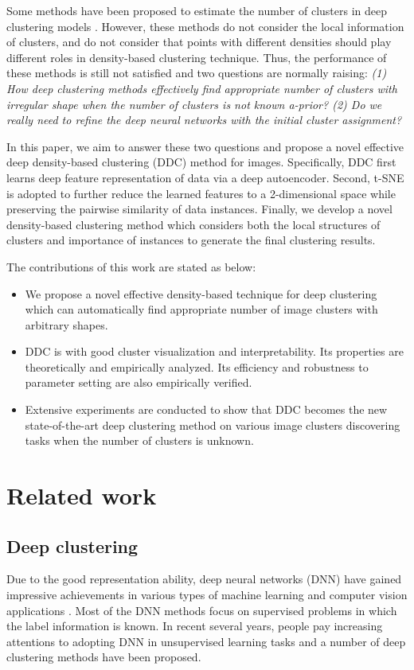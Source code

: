\documentclass[10pt,twocolumn,letterpaper]{article}
\begin{document}
Some methods have been proposed to estimate the number of clusters in deep clustering models \cite{lin2018deep,Shah2018DCC,Wang2018DED}. However, these methods  do not consider the local information of clusters, and do not consider that points with different densities should play different roles in density-based clustering technique.  Thus, the performance of these methods is still not satisfied and two questions are normally raising: \textit{(1) How deep clustering methods effectively find appropriate number of clusters with irregular shape when the number of clusters is not known a-prior? (2) Do we really need to refine the deep neural networks  with the initial cluster assignment?}


In this paper, we aim to answer these two questions and propose a novel effective deep density-based clustering (DDC) method for images. Specifically, DDC first learns deep feature representation of data via a deep autoencoder. Second, t-SNE \cite{maaten2008tSNE} is adopted to further reduce the learned features to a 2-dimensional space while preserving the pairwise similarity of data instances. Finally, we develop a novel density-based clustering method which considers both the local structures of clusters and importance of instances to generate the final clustering results. 

The contributions of this work are stated as below:
\begin{itemize}
    \item We propose a novel effective density-based technique for deep clustering which can automatically find appropriate number of image clusters with arbitrary shapes.
    \item  DDC is with good cluster visualization and interpretability. Its properties are theoretically and empirically analyzed. Its efficiency and robustness to parameter setting are also empirically verified.
\item Extensive experiments are conducted to show that DDC becomes the new state-of-the-art deep clustering method on various image clusters discovering tasks when the number of clusters is unknown.  
\end{itemize}


\section{Related work}\label{sec:related}
\subsection{Deep clustering}
Due to the good representation ability, deep neural networks (DNN) have gained impressive achievements in various types of machine learning and computer vision applications \cite{Bengio2009Learning,Bengio2013Learning,Hinton2006A}. Most of the DNN methods focus on supervised problems in which the label information is known. In recent several years, people pay increasing attentions to adopting DNN in unsupervised learning tasks and a number of deep clustering methods have been proposed. 
\end{document}
